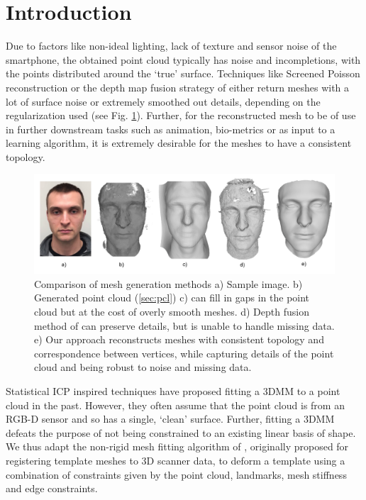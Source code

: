 
\section{Introduction}
Due to factors like non-ideal lighting, lack of texture and sensor noise of the smartphone, the obtained point cloud typically has noise and incompletions, with the points distributed around the `true' surface.
 Techniques like Screened Poisson reconstruction or the depth map fusion strategy of \cite{hernandez2015near} either return meshes with a lot of surface noise or extremely smoothed out details, depending on the regularization used (see Fig. \ref{fig:mesh_comp}). Further, for the reconstructed mesh to be of use in further downstream tasks such as animation, bio-metrics or as input to a learning algorithm, it is extremely desirable for the meshes to have a consistent topology. 
 \begin{figure}[t]
\begin{center}
   \includegraphics[width=0.95\linewidth]{images/meshing_compare.png}
\end{center}
   \caption{Comparison of mesh generation methods a) Sample image. b) Generated point cloud (\ref{sec:pcl}) c) \cite{kazhdan2013screened} can fill in gaps in the point cloud but at the cost of overly smooth meshes. d) Depth fusion method of \cite{hernandez2015near} can preserve details, but is unable to handle missing data. e) Our approach reconstructs meshes with consistent topology and correspondence between vertices, while capturing details of the point cloud and being robust to noise and missing data. }
\label{fig:mesh_comp}
\end{figure}

 Statistical ICP inspired techniques have proposed fitting a 3DMM to a point cloud \cite{schneider2009fitting,bazik2017robust,blanz2004statistical} in the past. However, they often assume that the point cloud is from an RGB-D sensor and so has a single, `clean' surface. Further, fitting a 3DMM defeats the purpose of not being constrained to an existing linear basis of shape.
 We thus adapt the non-rigid mesh fitting algorithm of \cite{amberg2007optimal}, originally proposed for registering template meshes to 3D scanner data, to deform a template using a combination of constraints given by the point cloud, landmarks, mesh stiffness and edge constraints. 
 
